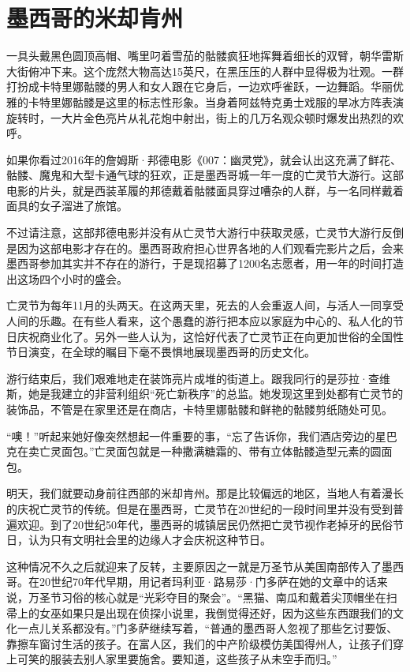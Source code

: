 \documentclass[12pt,oneside]{book}
\begin{document}
\section{墨西哥的米却肯州}
\begin{bookref}[frametitle={\cite{好好告别：世界葬礼观察手记}}]
一具头戴黑色圆顶高帽、嘴里叼着雪茄的骷髅疯狂地挥舞着细长的双臂，朝华雷斯大街俯冲下来。这个庞然大物高达15英尺，在黑压压的人群中显得极为壮观。一群打扮成卡特里娜骷髅的男人和女人跟在它身后，一边欢呼雀跃，一边舞蹈。华丽优雅的卡特里娜骷髅是这里的标志性形象。当身着阿兹特克勇士戏服的旱冰方阵表演旋转时，一大片金色亮片从礼花炮中射出，街上的几万名观众顿时爆发出热烈的欢呼。

如果你看过2016年的詹姆斯·邦德电影《007：幽灵党》，就会认出这充满了鲜花、骷髅、魔鬼和大型卡通气球的狂欢，正是墨西哥城一年一度的亡灵节大游行。这部电影的片头，就是西装革履的邦德戴着骷髅面具穿过嘈杂的人群，与一名同样戴着面具的女子溜进了旅馆。

不过请注意，这部邦德电影并没有从亡灵节大游行中获取灵感，亡灵节大游行反倒是因为这部电影才存在的。墨西哥政府担心世界各地的人们观看完影片之后，会来墨西哥参加其实并不存在的游行，于是现招募了1200名志愿者，用一年的时间打造出这场四个小时的盛会。

亡灵节为每年11月的头两天。在这两天里，死去的人会重返人间，与活人一同享受人间的乐趣。在有些人看来，这个愚蠢的游行把本应以家庭为中心的、私人化的节日庆祝商业化了。另外一些人认为，这恰好代表了亡灵节正在向更加世俗的全国性节日演变，在全球的瞩目下毫不畏惧地展现墨西哥的历史文化。

游行结束后，我们艰难地走在装饰亮片成堆的街道上。跟我同行的是莎拉·查维斯，她是我建立的非营利组织“死亡新秩序”的总监。她发现这里到处都有亡灵节的装饰品，不管是在家里还是在商店，卡特里娜骷髅和鲜艳的骷髅剪纸随处可见。

“噢！”听起来她好像突然想起一件重要的事，“忘了告诉你，我们酒店旁边的星巴克在卖亡灵面包。”亡灵面包就是一种撒满糖霜的、带有立体骷髅造型元素的圆面包。

明天，我们就要动身前往西部的米却肯州。那是比较偏远的地区，当地人有着漫长的庆祝亡灵节的传统。但是在墨西哥，亡灵节在20世纪的一段时间里并没有受到普遍欢迎。到了20世纪50年代，墨西哥的城镇居民仍然把亡灵节视作老掉牙的民俗节日，认为只有文明社会里的边缘人才会庆祝这种节日。

这种情况不久之后就迎来了反转，主要原因之一就是万圣节从美国南部传入了墨西哥。在20世纪70年代早期，用记者玛利亚·路易莎·门多萨在她的文章中的话来说，万圣节习俗的核心就是“光彩夺目的聚会”。“黑猫、南瓜和戴着尖顶帽坐在扫帚上的女巫如果只是出现在侦探小说里，我倒觉得还好，因为这些东西跟我们的文化一点儿关系都没有。”门多萨继续写着，“普通的墨西哥人忽视了那些乞讨要饭、靠擦车窗讨生活的孩子。在富人区，我们的中产阶级模仿美国得州人，让孩子们穿上可笑的服装去别人家里要施舍。要知道，这些孩子从未空手而归。”


\end{bookref}
\end{document}
